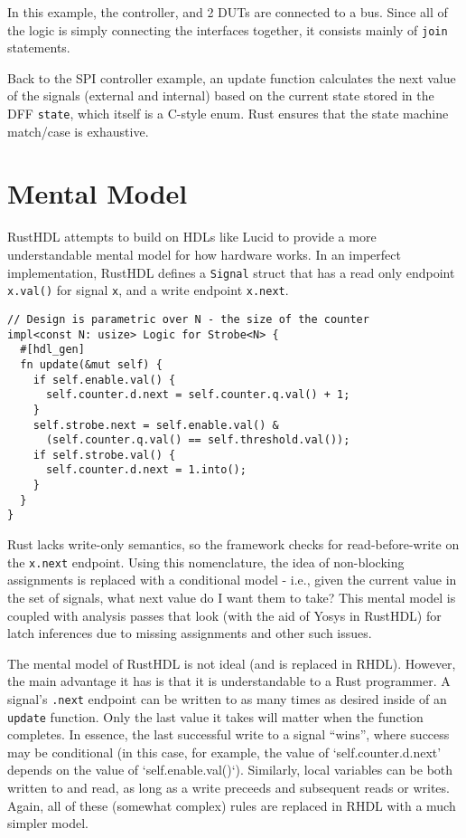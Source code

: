 \documentclass[sigplan,screen,sigconf]{acmart}
\begin{document}
In this example, the controller, and 2 DUTs are connected to a bus.  Since all of the logic is simply
connecting the interfaces together, it consists mainly of \verb|join| statements. 

Back to the SPI controller example, an update function calculates the next value of the 
signals (external and internal) based on the current state stored in the DFF \verb|state|,
which itself is a C-style enum.  Rust ensures that the state machine match/case is exhaustive. 

\section{Mental Model}
RustHDL attempts to build on HDLs like Lucid\cite{b11} to provide a more understandable mental model for how 
hardware works.  In an imperfect implementation, RustHDL defines a \verb|Signal| struct that has a 
read only endpoint \verb|x.val()| for signal \verb|x|, and a write endpoint \verb|x.next|.  

\begin{verbatim}
// Design is parametric over N - the size of the counter
impl<const N: usize> Logic for Strobe<N> {
  #[hdl_gen]
  fn update(&mut self) {
    if self.enable.val() {
      self.counter.d.next = self.counter.q.val() + 1;
    }
    self.strobe.next = self.enable.val() & 
      (self.counter.q.val() == self.threshold.val());
    if self.strobe.val() {
      self.counter.d.next = 1.into();
    }
  }
} 
\end{verbatim}

Rust lacks write-only semantics, so the framework checks for read-before-write on the \verb|x.next| 
endpoint.  Using this nomenclature, the idea of non-blocking assignments is replaced with a
 conditional model - i.e., given the current value in the set of signals, what next value do I 
want them to take?  This mental model is coupled with analysis passes that look (with the aid 
of Yosys\cite{b12} in RustHDL) for latch inferences due to missing assignments and other such issues.

The mental model of RustHDL is not ideal (and is replaced in RHDL).  However, the main advantage it has
is that it is understandable to a Rust programmer.  A signal's \verb|.next| endpoint can be written 
to as many times as desired inside of an \verb|update| function.  Only the last value it takes will
matter when the function completes.  In essence, the last successful write to a signal ``wins'', where
success may be conditional (in this case, for example, the value of `self.counter.d.next' depends on 
the value of `self.enable.val()`).  Similarly, local variables can be both written to and read, as long as 
a write preceeds and subsequent reads or writes.  Again, all of these (somewhat complex) rules are replaced
in RHDL with a much simpler model.
\end{document}
